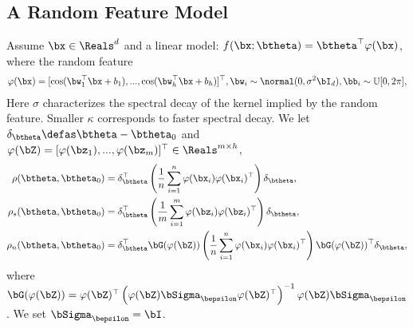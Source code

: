 
\newpage 
\subsection{A Random Feature Model}
Assume $ \bx \in \Reals^d$ and a linear model: $f(\bx; \btheta) = \btheta^{\top}\varphi(\bx)$, where the random feature
\begin{align}
    \varphi(\bx) = [\cos(\bw_1^{\top}\bx + b_1), ..., \cos(\bw_h^{\top}\bx + b_h)]^{\top}, \bw_i \sim \normal(0, \sigma^2 \bI_d), \bb_i \sim \mathbb{U}[0, 2\pi],
\end{align}
Here $\sigma$ characterizes the spectral decay of the kernel implied by the random feature. Smaller $\kappa$ corresponds to faster spectral decay. We let $\delta_{\btheta} \defas \btheta - \btheta_0$ and $\varphi(\bZ) = [\varphi(\bz_1), ..., \varphi(\bz_m)]^{\top} \in \Reals^{m \times h}$,
\begin{align}
    \rho(\btheta, \btheta_0) &= \delta_{\btheta}^{\top}\left(\frac{1}{n}\sum_{i=1}^n \varphi(\bx_i) \varphi(\bx_i)^{\top}\right)\delta_{\btheta}, \\
    \rho_s(\btheta, \btheta_0) &= \delta_{\btheta}^{\top}\left(\frac{1}{m}\sum_{i=1}^m \varphi(\bz_i) \varphi(\bz_i)^{\top}\right)\delta_{\btheta}, \\
    \rho_n(\btheta, \btheta_0) &= \delta_{\btheta}^{\top} \bG(\varphi(\bZ))\left( \frac{1}{n}\sum_{i=1}^n \varphi(\bx_i) \varphi(\bx_i)^{\top} \right) \bG(\varphi(\bZ))^{\top} \delta_{\btheta},
\end{align}
where $\bG(\varphi(\bZ)) = \varphi(\bZ)^{\top} \left( \varphi(\bZ) \bSigma_{\bepsilon}  \varphi(\bZ)^{\top} \right)^{-1}\varphi(\bZ) \bSigma_{\bepsilon} $. We set $\bSigma_{\bepsilon} = \bI$.


